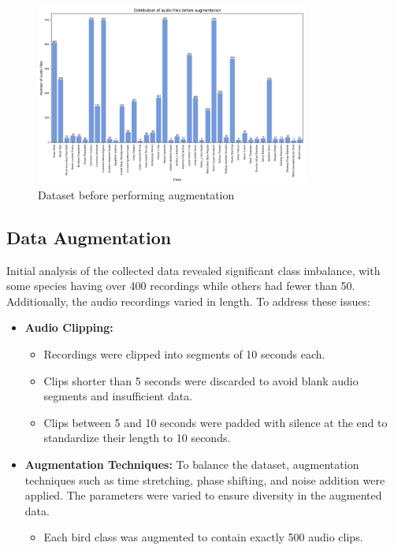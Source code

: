         \begin{figure}[h!]
            \centering
            \includegraphics[width=0.8\textwidth]{images/before_augmentation.png}
            \caption{Dataset before performing augmentation}
            \label{fig:visualization}
        \end{figure}

        \subsection{Data Augmentation}
        Initial analysis of the collected data revealed significant class imbalance,
        with some species having over 400 recordings while others had fewer than 50.
        Additionally, the audio recordings varied in length. To address these issues:
        \begin{itemize}
            \item \textbf{Audio Clipping:}
                \begin{itemize}
                    \item Recordings were clipped into segments of 10 seconds each.
                    \item Clips shorter than 5 seconds were discarded to avoid blank audio segments and
                            insufficient data.
                    \item Clips between 5 and 10 seconds were padded with silence at the end to
                            standardize their length to 10 seconds.
                \end{itemize}
        
            \item \textbf{Augmentation Techniques:}
                To balance the dataset, augmentation techniques such as time stretching, phase shifting, and noise addition were applied. The parameters were varied to ensure diversity in the augmented data.
                \begin{itemize}
                    \item Each bird class was augmented to contain exactly 500 audio clips.
                \end{itemize}
        \end{itemize}
        
